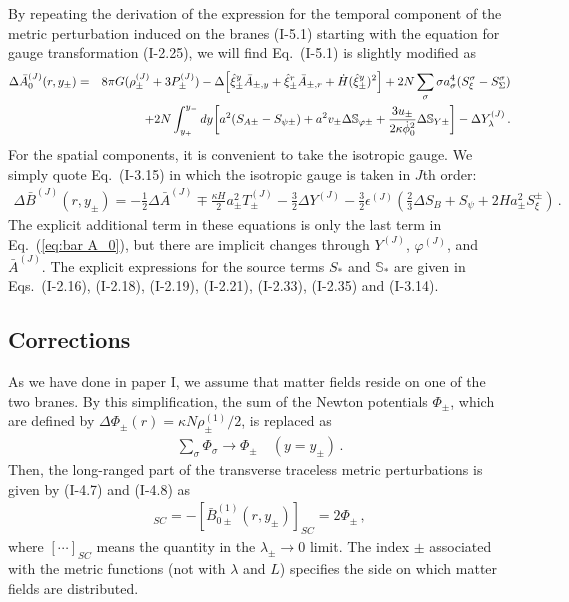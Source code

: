 \documentclass[a4paper,showpacs,preprintnumbers,amsmath,amssymb]{revtex4}
\begin{document}
By repeating the derivation of the expression for the temporal component of the metric perturbation induced on the branes (I-5.1) starting with the equation for gauge transformation (I-2.25), we will find Eq.~(I-5.1) is slightly modified as 
\begin{eqnarray}
  \Delta \bar A^{(J)} _{0 }(r,y_{\pm})
   &=&  8 \pi G 
      (\rho ^{(J)}_{\pm} + 3P ^{(J)}_{\pm}  )
 - {\Delta} 
   \Bigl[
     {\hat\xi_{ \pm }^y} \bar{A} _{\pm,y} 
   + {\hat\xi_{ \pm }^r} \bar{A} _{\pm,r}
   + \dot H ( {\hat\xi_{ \pm }^y})^2 
    \Bigr]
   + 2N \sum_\sigma \sigma a_{\sigma}^4 (S_{\xi}^{\sigma} - S_{\Sigma}^{\sigma})
\nonumber
\\
& &  
 +  {2N}  \int^{y_{-}}_{y_{+}} dy 
  \biggl[ 
    a^2 ( S_{A\pm} - S_{\psi\pm})
  + a^2 v_{\pm} \Delta {\mathbb S}_{\varphi\pm} 
  + \frac{3u_{\pm}}{2 \kappa \dot \phi_0^2}  
    \Delta {\mathbb S}_{Y\pm}
\biggr] 
-
  \Delta Y^{(J)}_{ \lambda }
\,.  
\label{eq:bar A_0}
\end{eqnarray}
For the spatial components, it is convenient to take the isotropic gauge.  We simply quote Eq.~(I-3.15) in which the isotropic gauge is taken in $J$th order:
\begin{eqnarray} 
   \Delta \bar B^{(J)}  (r,y_\pm )
   = - \frac{1}{2} \Delta \bar A^{(J)}  
 \mp \frac{\kappa H}{2}a^2_\pm T^{(J)}_\pm
 - \frac{3}{2} \Delta Y^{(J)}
 - \frac{3}{2} \epsilon^{(J)}
\left(
    \frac{2}{3}\Delta  S_B 
  + S_\psi + 2Ha^2_\pm S^\pm_\xi
\right) \,.
\label{eq:bar B^2}
\end{eqnarray}
The explicit additional term in these equations is only the last term
in Eq.~(\ref{eq:bar A_0}), but there are implicit changes through $Y^{(J)}$, $\varphi^{(J)}$, and  
$\bar A^{(J)}$. 
The explicit expressions for the source terms 
$S_*$ and ${\mathbb S}_*$ are given in 
Eqs.~(I-2.16), (I-2.18), (I-2.19), (I-2.21), (I-2.33), (I-2.35) and  (I-3.14).  


\subsection{Corrections}

As we have done in paper I, we assume that matter fields reside on one of the two branes.  By this simplification, the sum of the Newton potentials $\Phi_\pm $, which are defined by $\Delta \Phi_\pm (r) = \kappa N \rho_\pm^{(1)}/2$, is replaced as 
\begin{eqnarray}
   \sum_\sigma \Phi_\sigma 
   \to 
   \Phi_\pm  
   \quad   (y=y_{\pm}) \,.
\label{eq:simp} 
\end{eqnarray}
Then, the long-ranged part of the transverse traceless metric perturbations is given by (I-4.7) and (I-4.8) as
\begin{eqnarray}
  [\bar A^{(1)}_{0\pm}(r, y_\pm)]_{SC} =  
  - [\bar B^{(1)}_{0\pm} (r, y_\pm)]_{SC} =  2\Phi_{\pm} \,, 
\end{eqnarray} 
where $[\cdots]_{SC}$ means the quantity in the $\lambda_\pm\to 0$ limit.
The index $\pm$ associated with the metric functions (not with $\lambda$ and $L$) specifies the side on which matter fields are distributed. 
\end{document}
